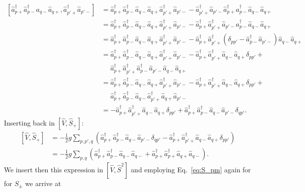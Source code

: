 \documentclass[a4paper,11pt,twoside]{article}
\begin{document}
\begin{align*}
\left[ \hat a_{p+}^\dagger \hat a_{p-}^\dagger \hat a_{q-} \hat a_{q+}, \hat a_{p'+}^\dagger \hat a_{p'-} \right]
%
&= \hat a_{p+}^\dagger \hat a_{p-}^\dagger \hat a_{q-} \hat a_{q+} \hat a_{p'+}^\dagger \hat a_{p'-} - \hat a_{p'+}^\dagger \hat a_{p'-} \hat a_{p+}^\dagger \hat a_{p-}^\dagger \hat a_{q-} \hat a_{q+} \\
%
&= \hat a_{p+}^\dagger \hat a_{p-}^\dagger \hat a_{q-} \hat a_{q+} \hat a_{p'+}^\dagger \hat a_{p'-} - \hat a_{p+}^\dagger \hat a_{p'+}^\dagger \hat a_{p'-} \hat a_{p-}^\dagger \hat a_{q-} \hat a_{q+} \\
%
&= \hat a_{p+}^\dagger \hat a_{p-}^\dagger \hat a_{q-} \hat a_{q+} \hat a_{p'+}^\dagger \hat a_{p'-} - \hat a_{p+}^\dagger \hat a_{p'+}^\dagger \left( \delta_{pp'} - \hat a_{p-}^\dagger \hat a_{p'-} \right) \hat a_{q-} \hat a_{q+} \\
%
&= \hat a_{p+}^\dagger \hat a_{p-}^\dagger \hat a_{q-} \hat a_{q+} \hat a_{p'+}^\dagger \hat a_{p'-} - \hat a_{p+}^\dagger \hat a_{p'+}^\dagger \hat a_{q-} \hat a_{q+} \delta_{pp'} + \\
&\quad\,\,
\hat a_{p+}^\dagger \hat a_{p'+}^\dagger \hat a_{p-}^\dagger \hat a_{p'-} \hat a_{q-} \hat a_{q+}  \\
%
&= \hat a_{p+}^\dagger \hat a_{p-}^\dagger \hat a_{q-} \hat a_{q+} \hat a_{p'+}^\dagger \hat a_{p'-} - \hat a_{p+}^\dagger \hat a_{p'+}^\dagger \hat a_{q-} \hat a_{q+} \delta_{pp'} + \\
&\quad\,\,
\hat a_{p+}^\dagger \hat a_{p-}^\dagger \hat a_{q-} \hat a_{p'+}^\dagger \hat a_{q+} \hat a_{p'-}  \\
%
&= - \hat a_{p+}^\dagger \hat a_{p'+}^\dagger \hat a_{q-} \hat a_{q+} \delta_{pp'} +
\hat a_{p+}^\dagger \hat a_{p-}^\dagger \hat a_{q-} \hat a_{p'-} \delta_{qp'} .
\end{align*}
%
Inserting back in  $[\hat V, \hat S_+]$:
\begin{align*}
\left[ \hat V, \hat S_+ \right]
%
&= -\frac{1}{2} g \sum_{p,p',q} \left( \hat a_{p+}^\dagger \hat a_{p-}^\dagger \hat a_{q-} \hat a_{p'-} \delta_{qp'}  - \hat a_{p+}^\dagger \hat a_{p'+}^\dagger \hat a_{q-} \hat a_{q+} \delta_{pp'} \right) \\
%
&= -\frac{1}{2} g \sum_{p,q} \left( \hat a_{p+}^\dagger \hat a_{p-}^\dagger \hat a_{q-} \hat a_{q-} + \hat a_{p+}^\dagger \hat a_{p+}^\dagger \hat a_{q+} \hat a_{q-} \right).
\end{align*}
%
We insert then this expression in $[\hat V, \hat S^2]$ and employing Eq.~\eqref{eq:S_pm} again for for $S_\pm$ we arrive at
\end{document}
